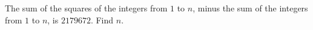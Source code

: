 The sum of the squares of the integers from $1$ to $n$, minus the sum of the integers from $1$ to $n$, is $2179672$. Find $n$.
